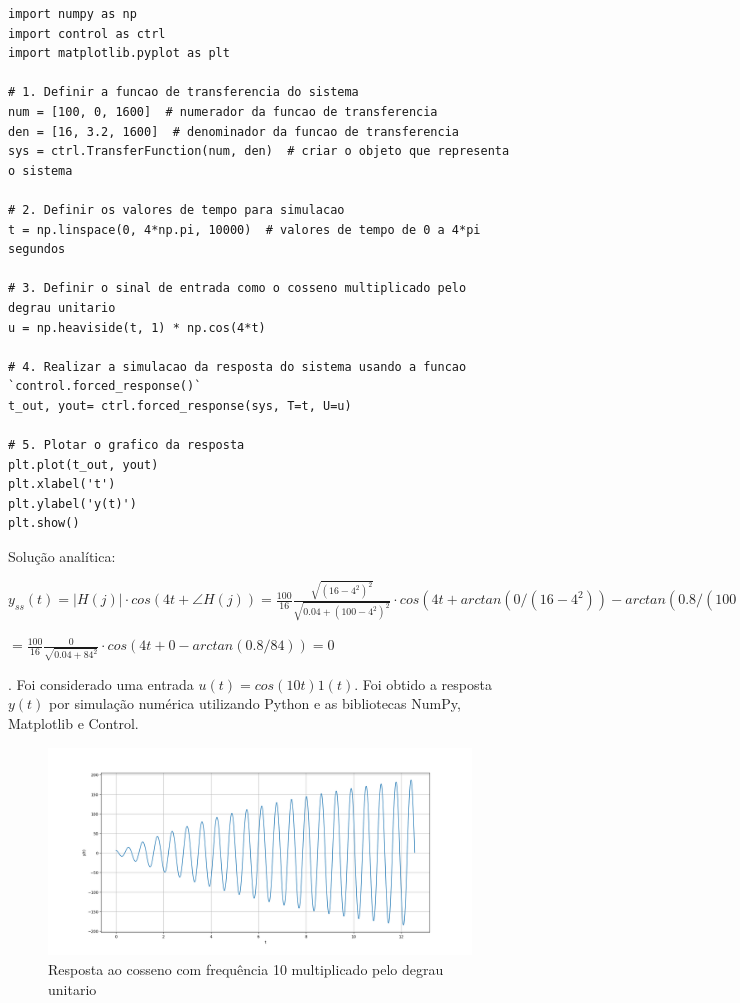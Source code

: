 \documentclass[10pt]{article}
\begin{document}
\begin{lstlisting}
import numpy as np
import control as ctrl
import matplotlib.pyplot as plt

# 1. Definir a funcao de transferencia do sistema
num = [100, 0, 1600]  # numerador da funcao de transferencia
den = [16, 3.2, 1600]  # denominador da funcao de transferencia
sys = ctrl.TransferFunction(num, den)  # criar o objeto que representa o sistema

# 2. Definir os valores de tempo para simulacao
t = np.linspace(0, 4*np.pi, 10000)  # valores de tempo de 0 a 4*pi segundos

# 3. Definir o sinal de entrada como o cosseno multiplicado pelo degrau unitario
u = np.heaviside(t, 1) * np.cos(4*t)

# 4. Realizar a simulacao da resposta do sistema usando a funcao `control.forced_response()`
t_out, yout= ctrl.forced_response(sys, T=t, U=u)

# 5. Plotar o grafico da resposta
plt.plot(t_out, yout)
plt.xlabel('t')
plt.ylabel('y(t)')
plt.show()
\end{lstlisting}

\quad Solução analítica:

$y_{ss}(t) = |H(j)| \cdot cos(4 t + \angle H(j)) = \frac{100}{16} \frac{\sqrt{(16-4^2)^2}}{\sqrt{0.04 + (100 - 4^2)^2}} \cdot cos(4 t + arctan(0/(16 - 4^2)) - arctan(0.8/(100 - 4^2))) =$

$= \frac{100}{16} \frac{0}{\sqrt{0.04 + 84^2}} \cdot cos(4 t + 0 - arctan(0.8/84)) = 0$

\newpage

. Foi considerado uma entrada $u(t) = cos(10 t) 1(t)$. Foi obtido a resposta $y(t)$ por simulação numérica utilizando Python
e as bibliotecas NumPy, Matplotlib e Control.

\begin{figure}[h]
    \centering
    \includegraphics[scale=0.45]{questao3.png}
    \caption{Resposta ao cosseno com frequência 10 multiplicado pelo degrau unitario}
\end{figure}
\end{document}
